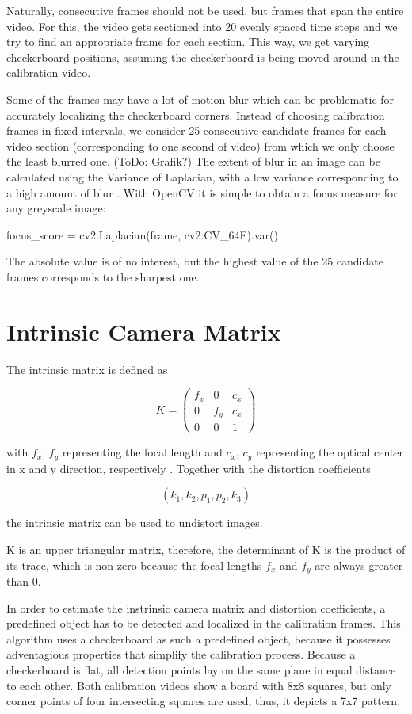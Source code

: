 \documentclass[bibliography=totoc]{scrartcl}
\begin{document}
Naturally, consecutive frames should not be used, but frames that span the entire video.
For this, the video gets sectioned into 20 evenly spaced time steps and we try to find an appropriate frame for each section.
This way, we get varying checkerboard positions, assuming the checkerboard is being moved around in the calibration video.

Some of the frames may have a lot of motion blur which can be problematic for accurately localizing the checkerboard corners.
Instead of choosing calibration frames in fixed intervals, we consider 25 consecutive candidate frames for each video section (corresponding to one second of video) from which we only choose the least blurred one. (ToDo: Grafik?)
The extent of blur in an image can be calculated using the Variance of Laplacian, with a low variance corresponding to a high amount of blur \cite{BlurDetection}.
With OpenCV it is simple to obtain a focus measure for any greyscale image:

\begin{python}
    focus_score = cv2.Laplacian(frame, cv2.CV_64F).var()
\end{python}

The absolute value is of no interest, but the highest value of the 25 candidate frames corresponds to the sharpest one.


\section{Intrinsic Camera Matrix}
The intrinsic matrix is defined as

$$
K =
\begin{pmatrix}
    f_x & 0 & c_x \\
    0 & f_y & c_x \\
    0 & 0 & 1
\end{pmatrix}
$$

with $f_x$, $f_y$ representing the focal length and $c_x$, $c_y$ representing the optical center in x and y direction, respectively \cite{CameraCalibration}.
Together with the distortion coefficients 

$$(k_1, k_2, p_1, p_2, k_3)$$

the intrinsic matrix can be used to undistort images.

K is an upper triangular matrix, therefore, the determinant of K is the product of its trace, 
which is non-zero because the focal lengths $f_x$ and $f_y$ are always greater than 0. 

In order to estimate the instrinsic camera matrix and distortion coefficients, a predefined object has to be detected and localized in the calibration frames.
This algorithm uses a checkerboard as such a predefined object, because it possesses adventagious properties that simplify the calibration process.
Because a checkerboard is flat, all detection points lay on the same plane in equal distance to each other.
Both calibration videos show a board with 8x8 squares, but only corner points of four intersecting squares are used, thus, it depicts a 7x7 pattern.
\end{document}
